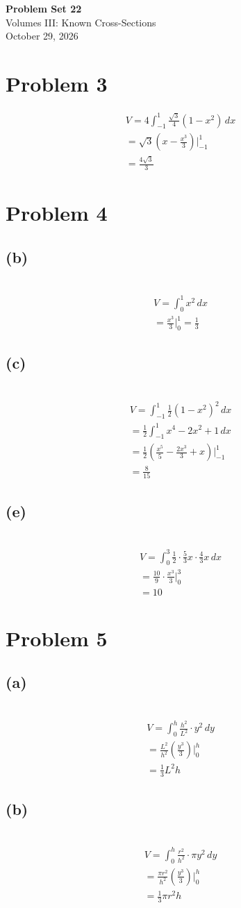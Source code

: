 \documentclass[12pt]{article}
\newcommand{\problem}[1]{\section{Problem #1}}
\newcommand{\subproblem}[1]{\subsection{(#1)} \,}
\begin{document}
\vspace*{0cm}

\begin{center}
    {\Large \bfseries Problem Set 22} \\[0.5cm]
    {\large Volumes III: Known Cross-Sections} \\[0.35cm]
    {\normalsize October 29, 2026}
\end{center}


\problem{3}

\begin{gather*}
    V=4\int_{-1}^1 \frac{\sqrt{3}}{4}(1-x^2)\, dx \\
    =\sqrt{3} (x-\frac{x^3}{3})\Big|_{-1}^1\\
    =\boxed{\frac{4\sqrt{3}}{3}}
\end{gather*}

\problem{4}

\subproblem{b}
\begin{gather*}
    V=\int_0^1 x^2\, dx\\
    = \frac{x^3}{3} \Big|^1_0 = \boxed{\frac{1}{3}}
\end{gather*}

\subproblem{c}
\begin{gather*}
    V=\int_{-1}^1 \frac{1}{2}(1-x^2)^2\, dx\\
    =\frac{1}{2} \int_{-1}^1  x^4-2x^2+1\, dx\\
    = \frac{1}{2}(\frac{x^5}{5}-\frac{2x^3}{3}+x)\Big|_{-1}^1\\
    = \boxed{\frac{8}{15}}
\end{gather*}

\subproblem{e}
\begin{gather*}
    V=\int_0^3 \frac{1}{2} \cdot \frac{5}{3}x\cdot \frac{4}{3}x\, dx\\
    = \frac{10}{9}\cdot \frac{x^3}{3} \Big|^3_0\\
    = \boxed{10}
\end{gather*}

\problem{5}

\subproblem{a}
\begin{gather*}
    V=\int_0^h \frac{h^2}{L^2}\cdot y^2 \, dy\\
    = \frac{L^2}{h^2} (\frac{y^3}{3})\Big|_0^h\\
    = \boxed{ \frac{1}{3}L^2h}
\end{gather*}

\subproblem{b}
\begin{gather*}
    V=\int_0^h \frac{r^2}{h^2} \cdot \pi y^2\, dy\\
    = \frac{\pi r^2}{h^2} (\frac{y^3}{3})\Big|_0^h\\
    =\boxed{\frac{1}{3}\pi r^2h}
\end{gather*}
\end{document}
